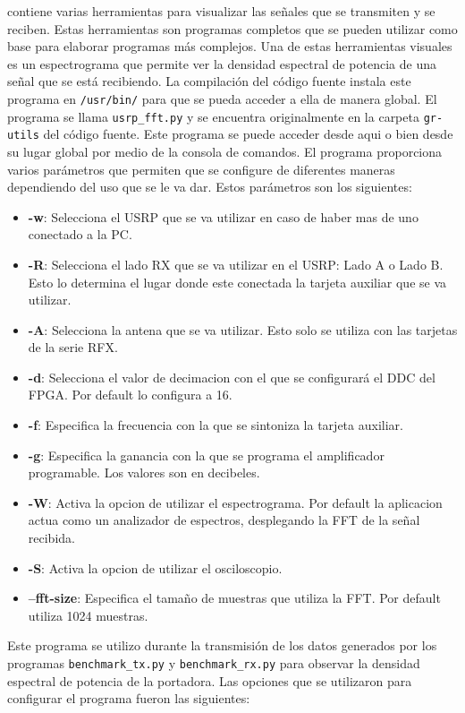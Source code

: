 \gnuradio contiene varias herramientas para visualizar las se\~nales que se transmiten y se reciben.
Estas herramientas son programas completos que se pueden utilizar como base para elaborar programas
m\'as complejos. Una de estas herramientas visuales es un espectrograma que permite ver la densidad
espectral de potencia de una se\~nal que se est\'a recibiendo. La compilaci\'on del c\'odigo fuente
instala este programa en \verb|/usr/bin/| para que se pueda acceder a ella de manera global. El
programa se llama \verb|usrp_fft.py| y se encuentra originalmente en la carpeta \verb|gr-utils| del
c\'odigo fuente. Este programa se puede acceder desde aqui o bien desde su lugar global por medio de
la consola de comandos. El programa proporciona varios par\'ametros que permiten que se configure de
diferentes maneras dependiendo del uso que se le va dar. Estos par\'ametros son los siguientes:

\begin{itemize}
  \item \textbf{-w}: Selecciona el USRP que se va utilizar en caso de haber mas de uno conectado a
  la PC.
  \item \textbf{-R}: Selecciona el lado RX que se va utilizar en el USRP: Lado A o Lado B. Esto lo
  determina el lugar donde este conectada la tarjeta auxiliar que se va utilizar.
  \item \textbf{-A}: Selecciona la antena que se va utilizar. Esto solo se utiliza con las tarjetas
  de la serie RFX.
  \item \textbf{-d}: Selecciona el valor de decimacion con el que se configurar\'a el DDC del FPGA.
  Por default lo configura a 16.
  \item \textbf{-f}: Especifica la frecuencia con la que se sintoniza la tarjeta auxiliar.
  \item \textbf{-g}: Especifica la ganancia con la que se programa el amplificador programable. Los
  valores son en decibeles.
  \item \textbf{-W}: Activa la opcion de utilizar el espectrograma. Por default la aplicacion actua
  como un analizador de espectros, desplegando la FFT de la se\~nal recibida.
  \item \textbf{-S}: Activa la opcion de utilizar el osciloscopio.
  \item \textbf{--fft-size}: Especifica el tama\~no de muestras que utiliza la FFT. Por default
  utiliza 1024 muestras.
\end{itemize} 

Este programa se utilizo durante la transmisi\'on de los datos generados por los programas
\verb|benchmark_tx.py| y \verb|benchmark_rx.py| para observar la densidad espectral de potencia de
la portadora. Las opciones que se utilizaron para configurar el programa fueron las siguientes:

